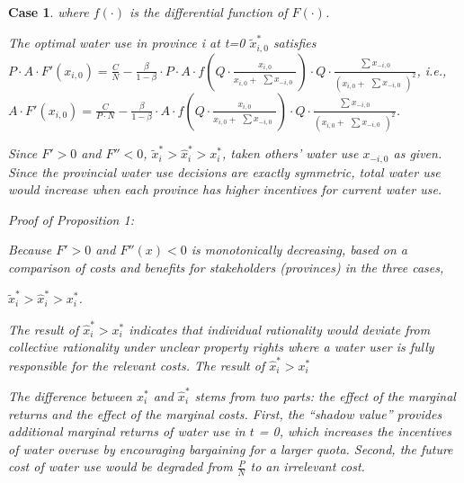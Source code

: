 \documentclass[default, sn-standardnature]{sn-jnl} %
\newtheorem{case_appendix}{Case}
\begin{document}
\begin{case_appendix}
where $f(\cdot)$ is the differential function of $F(\cdot)$.

The optimal water use in province i at t=0 $\widetilde x_{i,0}^*$ satisfies $P \cdot A \cdot F'(x_{i,0})=\frac{C}{N}-\frac{\beta}{1-\beta} \cdot P \cdot A \cdot f(Q \cdot \frac{x_{i,0}}{x_{i,0} + \begin{matrix} \sum x_{-i,0} \end{matrix}}) \cdot Q \cdot \frac{\begin{matrix} \sum x_{-i,0} \end{matrix}}{(x_{i,0} + \begin{matrix} \sum x_{-i,0} \end{matrix})^2}$,
i.e.,
$A \cdot F'(x_{i,0})=\frac{C}{P \cdot N} - \frac{\beta}{1-\beta} \cdot A \cdot f(Q \cdot \frac{x_{i,0}}{x_{i,0} + \begin{matrix} \sum x_{-i,0} \end{matrix}}) \cdot Q \cdot \frac{\begin{matrix} \sum x_{-i,0} \end{matrix}}{(x_{i,0} + \begin{matrix} \sum x_{-i,0} \end{matrix})^2}$.

Since $F'>0$ and $F''<0$, $\widetilde x_i^*>\hat x_i^*>x_i^*$, taken others' water use $x_{-i,0}$ as given. Since the provincial water use decisions are exactly symmetric, total water use would increase when each province has higher incentives for current water use.

Proof of Proposition 1:

Because $F'>0$ and $F''(x)<0$ is monotonically decreasing, based on a comparison of costs and benefits for stakeholders (provinces) in the three cases,

$\widetilde x_i^*>\hat x_i^*>x_i^*$.

The result of $\hat x_i^*>x_i^*$ indicates that individual rationality would deviate from collective rationality under unclear property rights where a water user is fully responsible for the relevant costs. The result of $\hat x_i^*>x_i^*$

The difference between $ x_i^*$ and $\hat x_i^*$ stems from two parts: the effect of the marginal returns and the effect of the marginal costs. First, the ``shadow value'' provides additional marginal returns of water use in $t$ = 0, which increases the incentives of water overuse by encouraging bargaining for a larger quota. Second, the future cost of water use would be degraded from $\frac{P}{N}$ to an irrelevant cost.


\end{case_appendix}
\end{document}

